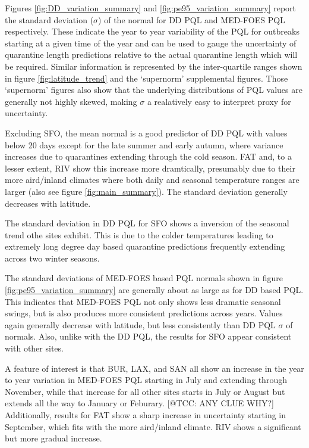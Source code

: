 \documentclass[10pt,a4paper,twocolumn]{article}
\begin{document}
Figures \ref{fig:DD_variation_summary} and \ref{fig:pe95_variation_summary}
report the standard deviation ($\sigma$) of the normal for DD PQL and MED-FOES PQL respectively.
These indicate the year to year variability of the PQL for outbreaks starting at a
given time of the year and can be used to gauge the uncertainty of quarantine length predictions 
relative to the actual quarantine length which will be required.
Similar information is represented by the inter-quartile ranges shown in figure \ref{fig:latitude_trend} and 
the `supernorm' supplemental figures.
Those `supernorm' figures also show that the underlying distributions of PQL values are generally
not highly skewed, making $\sigma$ a realatively easy to interpret proxy for uncertainty.

Excluding SFO, the mean normal is a good predictor of DD PQL with values below 20 days
except for the late summer and early autumn, where variance increases 
due to quarantines extending through the cold season.
FAT and, to a lesser extent, RIV show this increase more dramtically, presumably due to their more 
aird/inland climates where both daily and seasonal temperature ranges are larger
(also see figure \ref{fig:main_summary}).
The standard deviation generally decreases with latitude.

The standard deviation in DD PQL for SFO shows a inversion of the seasonal trend othe sites exhibit.
This is due to the colder temperatures leading to extremely long degree day based quarantine predictions
frequently extending across two winter seasons.

The standard deviations of MED-FOES based PQL normals shown in figure \ref{fig:pe95_variation_summary}
are generally about  as large as for DD based PQL.
This indicates that MED-FOES PQL not only shows less dramatic seasonal swings, but is also
produces more consistent predictions across years.
Values again generally decrease with latitude, but less consistently than DD PQL $\sigma$ of normals.
Also, unlike with the DD PQL, the results for SFO appear consistent with other sites.

A feature of interest is that BUR, LAX, and SAN all show an increase in the year to year variation
in MED-FOES PQL starting in July and extending through November, 
while that increase for all other sites starts in July or August 
but extends all the way to January or Feburary.
[@TCC: ANY CLUE WHY?]
Additionally, results for FAT show a sharp increase in uncertainty starting in September, which fits with the 
more aird/inland climate.  RIV shows a significant but more gradual increase.
\end{document}
